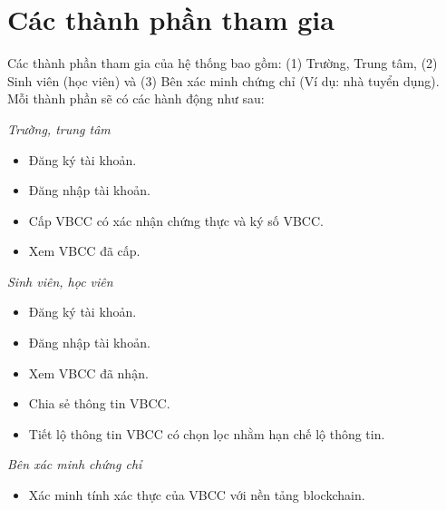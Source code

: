 \section{Các thành phần tham gia}
Các thành phần tham gia của hệ thống bao gồm: (1) Trường, Trung tâm, (2) Sinh viên (học viên) và (3) Bên xác minh chứng chỉ (Ví dụ: nhà tuyển dụng). Mỗi thành phần sẽ có các hành động như sau:

\emph{Trường, trung tâm}

\begin{itemize}
\item Đăng ký tài khoản.
\item Đăng nhập tài khoản.
\item Cấp VBCC có xác nhận chứng thực và ký số VBCC.
\item Xem VBCC đã cấp.
\end{itemize}

\emph{Sinh viên, học viên}

\begin{itemize}
\item Đăng ký tài khoản.
\item Đăng nhập tài khoản.
\item Xem VBCC đã nhận.
\item Chia sẻ thông tin VBCC.
\item Tiết lộ thông tin VBCC có chọn lọc nhằm hạn chế lộ thông tin.
\end{itemize}

\emph{Bên xác minh chứng chỉ}

\begin{itemize}
\item Xác minh tính xác thực của VBCC với nền tảng blockchain.
\end{itemize}


